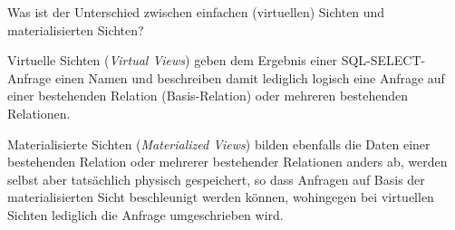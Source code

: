 Was ist der Unterschied zwischen einfachen (virtuellen) Sichten
und materialisierten Sichten?

\begin{solution}
Virtuelle Sichten (\emph{Virtual Views})
geben dem Ergebnis einer SQL-SELECT-Anfrage einen Namen
und beschreiben damit lediglich logisch
eine Anfrage auf einer bestehenden Relation (Basis-Relation)
oder mehreren bestehenden Relationen.

Materialisierte Sichten (\emph{Materialized Views})
bilden ebenfalls die Daten einer bestehenden Relation
oder mehrerer bestehender Relationen
anders ab,
werden selbst aber tatsächlich physisch gespeichert,
so dass Anfragen auf Basis der materialisierten Sicht beschleunigt werden können,
wohingegen bei virtuellen Sichten lediglich die Anfrage umgeschrieben wird.
\end{solution}
